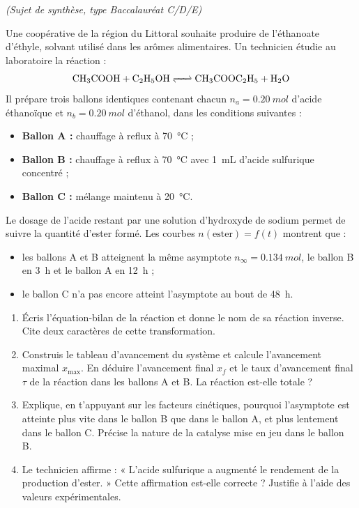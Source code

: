 \documentclass[11pt]{article}
\begin{document}
\begin{exercice}
\textit{(Sujet de synthèse, type Baccalauréat C/D/E)}

Une coopérative de la région du Littoral souhaite produire de l'éthanoate d'éthyle, solvant utilisé dans les arômes alimentaires. Un technicien étudie au laboratoire la réaction :
\[ \ce{CH3COOH + C2H5OH <=> CH3COOC2H5 + H2O} \]
Il prépare trois ballons identiques contenant chacun $n_a = \SI{0,20}{mol}$ d'acide éthanoïque et $n_b = \SI{0,20}{mol}$ d'éthanol, dans les conditions suivantes :
\begin{itemize}
\item \textbf{Ballon A :} chauffage à reflux à \SI{70}{\celsius} ;
\item \textbf{Ballon B :} chauffage à reflux à \SI{70}{\celsius} avec \SI{1}{mL} d'acide sulfurique concentré ;
\item \textbf{Ballon C :} mélange maintenu à \SI{20}{\celsius}.
\end{itemize}
Le dosage de l'acide restant par une solution d'hydroxyde de sodium permet de suivre la quantité d'ester formé. Les courbes $n(\text{ester}) = f(t)$ montrent que :
\begin{itemize}
\item les ballons A et B atteignent la même asymptote $n_{\infty} = \SI{0,134}{mol}$, le ballon B en \SI{3}{h} et le ballon A en \SI{12}{h} ;
\item le ballon C n'a pas encore atteint l'asymptote au bout de \SI{48}{h}.
\end{itemize}
\begin{enumerate}
\item Écris l'équation-bilan de la réaction et donne le nom de sa réaction inverse. Cite deux caractères de cette transformation.
\item Construis le tableau d'avancement du système et calcule l'avancement maximal $x_{\max}$. En déduire l'avancement final $x_f$ et le taux d'avancement final $\tau$ de la réaction dans les ballons A et B. La réaction est-elle totale ?
\item Explique, en t'appuyant sur les facteurs cinétiques, pourquoi l'asymptote est atteinte plus vite dans le ballon B que dans le ballon A, et plus lentement dans le ballon C. Précise la nature de la catalyse mise en jeu dans le ballon B.
\item Le technicien affirme : « L'acide sulfurique a augmenté le rendement de la production d'ester. » Cette affirmation est-elle correcte ? Justifie à l'aide des valeurs expérimentales.

\end{enumerate}
\end{exercice}
\end{document}
